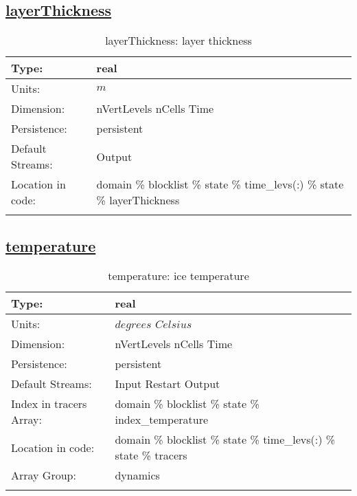 \subsection[layerThickness]{\hyperref[sec:var_tab_state]{layerThickness}}
\label{subsec:var_sec_state_layerThickness}
\begin{center}
\begin{longtable}{| p{2.0in} | p{4.0in} |}
        \hline 
        Type: & real \\
        \hline 
        Units: & $m$ \\
        \hline 
        Dimension: & nVertLevels nCells Time \\
        \hline 
        Persistence: & persistent \\
        \hline 
		 Default Streams: & Output  \\
        \hline 
		 Location in code: & domain \% blocklist \% state \% time\_levs(:) \% state \% layerThickness \\
		 \hline 
    \caption{layerThickness: layer thickness}
\end{longtable}
\end{center}
\subsection[temperature]{\hyperref[sec:var_tab_state]{temperature}}
\label{subsec:var_sec_state_temperature}
\begin{center}
\begin{longtable}{| p{2.0in} | p{4.0in} |}
        \hline 
        Type: & real \\
        \hline 
        Units: & $degrees$ $Celsius$ \\
        \hline 
        Dimension: & nVertLevels nCells Time \\
        \hline 
        Persistence: & persistent \\
        \hline 
		 Default Streams: & Input Restart Output  \\
        \hline 
		 Index in tracers Array: & domain \% blocklist \% state \% index\_temperature \\
		 \hline 
		 Location in code: & domain \% blocklist \% state \% time\_levs(:) \% state \% tracers \\
		 \hline 
		 Array Group: & dynamics \\
		 \hline 
    \caption{temperature: ice temperature}
\end{longtable}
\end{center}

